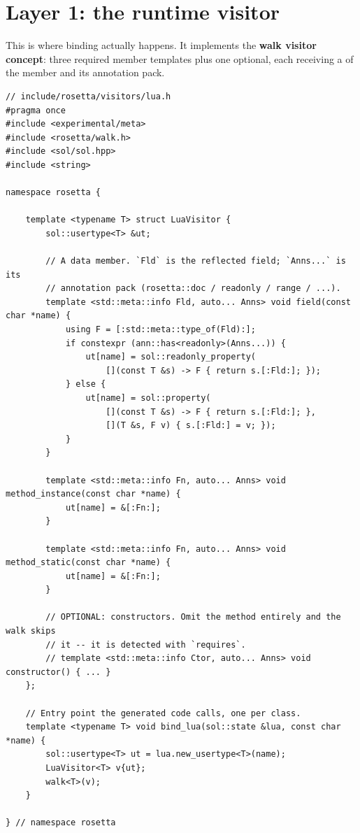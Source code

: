 \section{Layer 1: the runtime visitor}

This is where binding actually happens. It implements the \textbf{walk visitor
concept}: three required member templates plus one optional, each receiving a
 of the member and its annotation pack.

\begin{lstlisting}[style=cpp]
// include/rosetta/visitors/lua.h
#pragma once
#include <experimental/meta>
#include <rosetta/walk.h>
#include <sol/sol.hpp>
#include <string>

namespace rosetta {

    template <typename T> struct LuaVisitor {
        sol::usertype<T> &ut;

        // A data member. `Fld` is the reflected field; `Anns...` is its
        // annotation pack (rosetta::doc / readonly / range / ...).
        template <std::meta::info Fld, auto... Anns> void field(const char *name) {
            using F = [:std::meta::type_of(Fld):];
            if constexpr (ann::has<readonly>(Anns...)) {
                ut[name] = sol::readonly_property(
                    [](const T &s) -> F { return s.[:Fld:]; });
            } else {
                ut[name] = sol::property(
                    [](const T &s) -> F { return s.[:Fld:]; },
                    [](T &s, F v) { s.[:Fld:] = v; });
            }
        }

        template <std::meta::info Fn, auto... Anns> void method_instance(const char *name) {
            ut[name] = &[:Fn:];
        }

        template <std::meta::info Fn, auto... Anns> void method_static(const char *name) {
            ut[name] = &[:Fn:];
        }

        // OPTIONAL: constructors. Omit the method entirely and the walk skips
        // it -- it is detected with `requires`.
        // template <std::meta::info Ctor, auto... Anns> void constructor() { ... }
    };

    // Entry point the generated code calls, one per class.
    template <typename T> void bind_lua(sol::state &lua, const char *name) {
        sol::usertype<T> ut = lua.new_usertype<T>(name);
        LuaVisitor<T> v{ut};
        walk<T>(v);
    }

} // namespace rosetta
\end{lstlisting}

